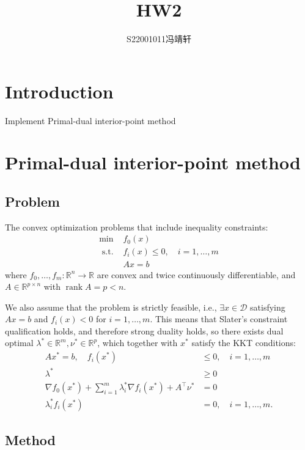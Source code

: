 \documentclass{article}
\title{HW2}
\author{S22001011冯靖轩}
\begin{document}
\maketitle

\section{Introduction}

Implement Primal-dual interior-point method

\section{Primal-dual interior-point method}

\subsection{Problem}
The convex optimization problems that include inequality constraints:
$$
\begin{array}{ll}
\min & f_0(x) \\
\text { s.t. } & f_i(x) \leq 0, \quad i=1, \ldots, m \\
& A x=b
\end{array}
$$
where $f_0, \ldots, f_m: \mathbb{R}^n \rightarrow \mathbb{R}$ are convex and twice continuously differentiable, and $A \in \mathbb{R}^{p \times n}$ with $\operatorname{rank} A=p<n$.

We also assume that the problem is strictly feasible, i.e., $\exists x \in \mathcal{D}$ satisfying $A x=b$ and $f_i(x)<0$ for $i=1, \ldots, m$.
This means that Slater's constraint qualification holds, and therefore strong duality holds, so there exists dual optimal $\lambda^* \in \mathbb{R}^m, \nu^* \in \mathbb{R}^p$, which together with $x^*$ satisfy the KKT conditions:
$$
\begin{aligned}
A x^*=b, \quad f_i\left(x^*\right) & \leq 0, \quad i=1, \ldots, m \\
\lambda^* & \geq 0 \\
\nabla f_0\left(x^*\right)+\sum_{i=1}^m \lambda_i^* \nabla f_i\left(x^*\right)+A^{\top} \nu^* & =0 \\
\lambda_i^* f_i\left(x^*\right) & =0, \quad i=1, \ldots, m .
\end{aligned}
$$

\subsection{Method}
\end{document}
